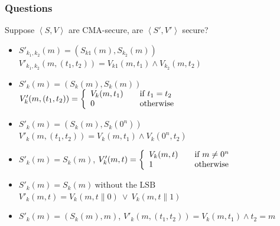 \begin{frame}\frametitle{Questions}
\begin{exampleblock}{Suppose $\left<S, V\right>$ are CMA-secure,  are $\left<S', V'\right>$ secure?}
\begin{itemize}
\item $S'_{k_{1},k_{2}}(m) = (S_{k1}(m),S_{k_{2}}(m))$\\
$V'_{k_{1},k_{2}}(m,(t_{1},t_{2})) = V_{k1}(m,t_{1}) \land V_{k_{2}}(m,t_{2})$
\item $S'_{k}(m) = (S_{k}(m),S_{k}(m))$\\
$ V'_{k}(m,(t_{1},t_{2})) = \left\{ 
  \begin{array}{l l}
    V_{k}(m,t_{1}) & \quad \text{if $t_{1}=t_{2}$}\\
    0 & \quad \text{otherwise}\\
  \end{array} \right. $
\item $S'_{k}(m) = (S_{k}(m),S_{k}(0^{n}))$\\
$ V'_{k}(m,(t_{1},t_{2})) = V_{k}(m,t_{1}) \land  V_{k}(0^{n},t_{2})$
\item $S'_{k}(m) = S_{k}(m)$, 
$ V'_{k}(m,t) = \left\{ 
  \begin{array}{l l}
    V_{k}(m,t) & \quad \text{if $m \neq 0^{n}$}\\
    1 & \quad \text{otherwise}\\
  \end{array} \right. $
\item $S'_{k}(m) = S_{k}(m)\ \text{without the LSB}$ \\
$V'_{k}(m,t) = V_{k}(m,t\| 0)\ \lor \ V_{k}(m,t\| 1)$
\item $S'_{k}(m) = (S_{k}(m),m)$, 
$V'_{k}(m,(t_{1},t_{2})) = V_{k}(m,t_{1}) \land t_{2} = m$
\end{itemize}
\end{exampleblock}
\end{frame}
